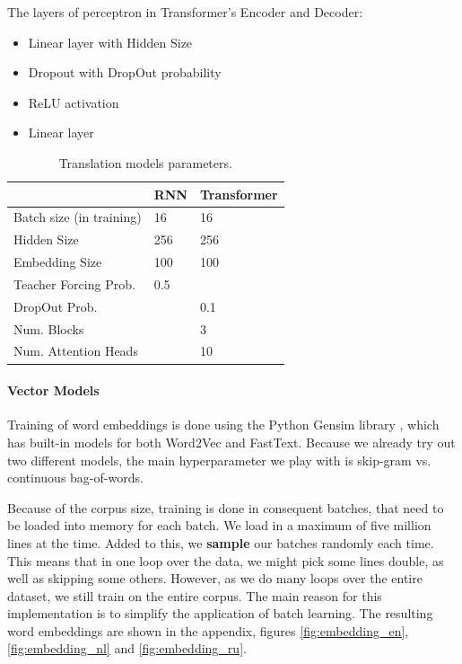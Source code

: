 \documentclass{article}
\begin{document}
The layers of perceptron in Transformer's Encoder and Decoder:
\begin{itemize}
    \item Linear layer with Hidden Size
    \item Dropout with DropOut probability
    \item ReLU activation
    \item Linear layer
\end{itemize}


\begin{table}[h!]
  \begin{center}
    \begin{tabular}{p{4cm}|p{2cm}|p{2cm}}
        & \textbf{RNN} & \textbf{Transformer}\\
        \hline
        Batch size (in training)      & 16     & 16     \\
        Hidden Size                   & 256    & 256    \\
        Embedding Size                & 100    & 100    \\
        Teacher Forcing Prob.         & 0.5    &        \\
        DropOut Prob.                 &        & 0.1    \\
        Num. Blocks                   &        & 3      \\
        Num. Attention Heads          &        & 10     \\
    \end{tabular}
    \caption{Translation models parameters.}
    \label{tb:params}
  \end{center}
\end{table}


\paragraph{Vector Models} Training of word embeddings is done using the Python Gensim library \cite{rehurek_lrec}, which has built-in models for both Word2Vec and FastText. Because we already try out two different models, the main hyperparameter we play with is skip-gram vs. continuous bag-of-words.

Because of the corpus size, training is done in consequent batches, that need to be loaded into memory for each batch. We load in a maximum of five million lines at the time. Added to this, we \textbf{sample} our batches randomly each time. This means that in one loop over the data, we might pick some lines double, as well as skipping some others. However, as we do many loops over the entire dataset, we still train on the entire corpus. The main reason for this implementation is to simplify the application of batch learning. The resulting word embeddings are shown in the appendix, figures \ref{fig:embedding_en}, \ref{fig:embedding_nl} and \ref{fig:embedding_ru}.
\end{document}
